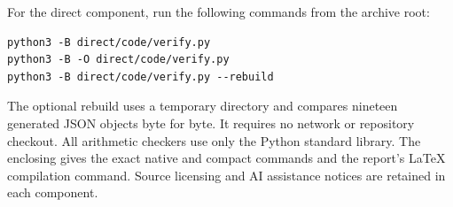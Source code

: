 For the direct component, run the following commands from the archive root:
\begin{verbatim}
python3 -B direct/code/verify.py
python3 -B -O direct/code/verify.py
python3 -B direct/code/verify.py --rebuild
\end{verbatim}
The optional rebuild uses a temporary directory and compares nineteen
generated JSON objects byte for byte. It requires no network or repository
checkout. All arithmetic checkers use only the Python standard library.
The enclosing  gives the exact native and compact commands
and the report's LaTeX compilation command. Source licensing and AI
assistance notices are retained in each component.
